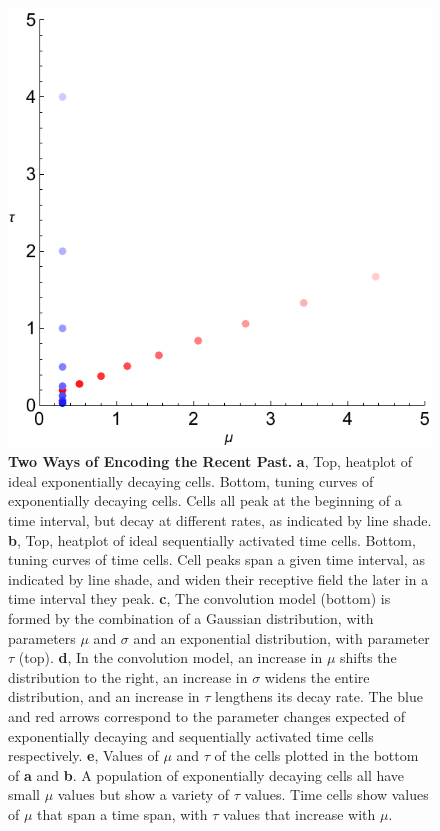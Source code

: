 \documentclass{apa}
\begin{document}
\begin{figure}
\begin{minipage}{.5\linewidth}
\begin{flushleft}
		\includegraphics[width = .98\linewidth]{figs/Mu_Tau.pdf}
		\end{flushleft}
	\end{minipage}
	\caption{
		\label{fig:SMTschematic} 
		\textbf{Two Ways of Encoding the Recent Past.} 
		\textbf{a}, Top, heatplot of ideal exponentially decaying cells.
		Bottom, tuning curves of exponentially decaying cells. Cells all peak
		at the beginning of a time interval, but decay at different rates, as
		indicated by line shade. 
		\textbf{b}, Top, heatplot of ideal sequentially activated time cells.
		Bottom, tuning curves of time cells.  Cell peaks span a given time
		interval, as indicated by line shade, and widen their receptive field
		the later in a time interval they peak. 
		\textbf{c}, The convolution model (bottom) is formed by the
		combination of a Gaussian distribution, with parameters $\mu$ and
		$\sigma$ and an exponential distribution, with parameter $\tau$ (top).
		\textbf{d}, In the convolution model, an increase in $\mu$ shifts the
		distribution to the right, an increase in $\sigma$ widens the entire
		distribution, and an increase in $\tau$ lengthens its decay rate. The
		blue and red arrows correspond to the parameter changes expected of
		exponentially decaying and sequentially activated time cells
		respectively. 
		\textbf{e}, Values of $\mu$ and $\tau$ of the cells plotted in the
		bottom of \textbf{a} and \textbf{b}. A population of exponentially
		decaying cells all have small $\mu$ values but show a variety of
		$\tau$ values. Time cells show values of $\mu$ that span a time span,
		with $\tau$ values that increase with $\mu$.
	}
\end{figure}
\end{document}
